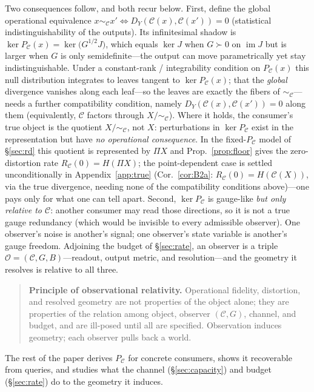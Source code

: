 \documentclass[11pt]{article}
\theoremstyle{definition}
\theoremstyle{remark}
\newcommand{\PC}{P_{\mathcal{C}}}
\begin{document}
Two consequences follow, and both recur below. First, define the global operational
equivalence $x\sim_{\mathcal{C}}x'\iff D_Y(\mathcal{C}(x),\mathcal{C}(x'))=0$
(statistical indistinguishability of the outputs). Its infinitesimal shadow is
$\ker\PC(x)=\ker\!\big(G^{1/2}J\big)$, which equals $\ker J$ when $G\succ0$ on
$\operatorname{im}J$ but is larger when $G$ is only semidefinite---the output can move
parametrically yet stay indistinguishable. Under a constant-rank / integrability
condition on $\PC(x)$ this null distribution integrates to leaves tangent to
$\ker\PC(x)$; that the \emph{global} divergence vanishes along each leaf---so the
leaves are exactly the fibers of $\sim_{\mathcal{C}}$---needs a further compatibility
condition, namely $D_Y(\mathcal{C}(x),\mathcal{C}(x'))=0$ along them (equivalently,
$\mathcal{C}$ factors through $X/\!\sim_{\mathcal{C}}$). Where it holds, the
consumer's true object is the quotient $X/\!\sim_{\mathcal{C}}$, not $X$:
perturbations in $\ker\PC$ exist in the representation but have \emph{no operational
consequence}. In the fixed-$\PC$ model of \S\ref{sec:rd} this quotient is represented
by $\Pi X$ and Prop.~\ref{prop:floor} gives the zero-distortion rate
$R_{\mathcal{C}}(0)=H(\Pi X)$; the point-dependent case is settled unconditionally in
Appendix~\ref{app:true} (Cor.~\ref{cor:B2a}: $R_{\mathcal{C}}(0)=H(\mathcal{C}(X))$,
via the true divergence, needing none of the compatibility conditions above)---one
pays only for
what one can tell apart. Second, $\ker\PC$ is
gauge-like \emph{but only relative to $\mathcal{C}$}: another consumer may read those
directions, so it is not a true gauge redundancy (which would be invisible to every
admissible observer). One observer's noise is another's signal; one observer's state
variable is another's gauge freedom. Adjoining the budget of \S\ref{sec:rate}, an
observer is a triple $\mathcal{O}=(\mathcal{C},G,B)$---readout, output metric, and
resolution---and the geometry it resolves is relative to all three.

\begin{quote}
\textbf{Principle of observational relativity.} Operational fidelity, distortion,
and resolved geometry are not properties of the object alone; they are properties of
the relation among object, observer $(\mathcal{C},G)$, channel, and budget, and are
ill-posed until all are specified. Observation induces geometry; each observer pulls
back a world.
\end{quote}

The rest of the paper derives $\PC$ for concrete consumers, shows it recoverable
from queries, and studies what the channel (\S\ref{sec:capacity}) and budget
(\S\ref{sec:rate}) do to the geometry it induces.
\end{document}
